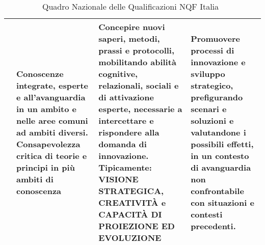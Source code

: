 \begin{sidewaystable}
\begin{adjustbox}{max width=\textwidth}
\begin{tabular}{@{}>{\centering\arraybackslash}p{1.0cm}p{6cm}p{12cm}p{12cm}}
\midrule
8&Conoscenze integrate, esperte e all'avanguardia in un ambito e nelle aree comuni ad ambiti diversi. Consapevolezza critica di teorie e principi in più ambiti di conoscenza&Concepire nuovi saperi, metodi, prassi e protocolli, mobilitando abilità cognitive, relazionali, sociali e di attivazione esperte, necessarie a intercettare e rispondere alla domanda di innovazione. Tipicamente: VISIONE STRATEGICA, CREATIVITÀ e CAPACITÀ DI PROIEZIONE ED EVOLUZIONE&Promuovere processi di innovazione e sviluppo strategico, prefigurando scenari e soluzioni e valutandone i possibili effetti, in un contesto di avanguardia non confrontabile con situazioni e contesti precedenti. \\
\bottomrule
\end{tabular}
\end{adjustbox}
\caption[Quadro Nazionale delle Qualificazioni NQF Italia]{Quadro Nazionale delle Qualificazioni NQF Italia~\cite{DL2018}}
\end{sidewaystable}

